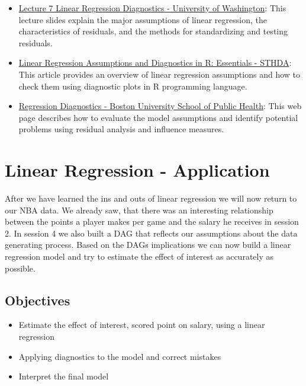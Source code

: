 \documentclass[
]{book}
\providecommand{\tightlist}{%
  \setlength{\itemsep}{0pt}\setlength{\parskip}{0pt}}
\begin{document}
\begin{itemize}
\tightlist
\item
  \href{https://courses.washington.edu/b515/l7.pdf}{Lecture 7 Linear Regression Diagnostics - University of Washington}: This lecture slides explain the major assumptions of linear regression, the characteristics of residuals, and the methods for standardizing and testing residuals.
\item
  \href{http://sthda.com/english/articles/39-regression-model-diagnostics/161-linear-regression-assumptions-and-diagnostics-in-r-essentials}{Linear Regression Assumptions and Diagnostics in R: Essentials - STHDA}: This article provides an overview of linear regression assumptions and how to check them using diagnostic plots in R programming language.
\item
  \href{https://sphweb.bumc.bu.edu/otlt/MPH-Modules/BS/R/R5_Correlation-Regression/R5_Correlation-Regression7.html}{Regression Diagnostics - Boston University School of Public Health}: This web page describes how to evaluate the model assumptions and identify potential problems using residual analysis and influence measures.
\end{itemize}

\hypertarget{lin-a}{%
\chapter{Linear Regression - Application}\label{lin-a}}

After we have learned the ins and outs of linear regression we will now
return to our NBA data.
We already saw, that there was an interesting relationship between the
points a player makes per game and the salary he receives in session 2. In
session 4 we also built a DAG that reflects our assumptions about the data
generating process. Based on the DAGs implications we can now build a linear
regression model and try to estimate the effect of interest as accurately as
possible.

\hypertarget{objectives-5}{%
\section{Objectives}\label{objectives-5}}

\begin{itemize}
\tightlist
\item
  Estimate the effect of interest, scored point on salary, using a linear regression
\item
  Applying diagnostics to the model and correct mistakes
\item
  Interpret the final model
\end{itemize}
\end{document}
